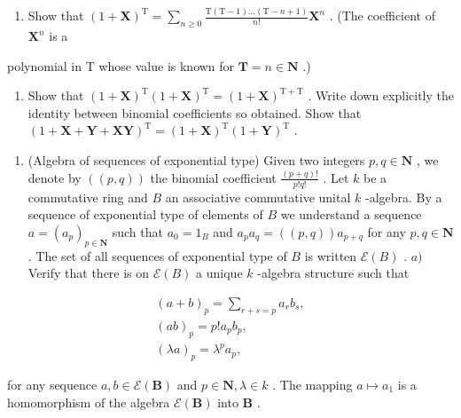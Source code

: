 \begin{enumerate}
\def\labelenumi{\alph{enumi})}
\tightlist
\item
  Show that \((1 + \mathbf{X})^{\mathrm{T}} = \sum_{n\geqslant 0}\frac{\mathrm{T}(\mathrm{T} - 1)\dots(\mathrm{T} - n + 1)}{n!}\mathbf{X}^{n}\) . (The coefficient of \(\mathbf{X}^n\) is a
\end{enumerate}

polynomial in T whose value is known for \(\mathbf{T} = n\in \mathbf{N}\) .)

\begin{enumerate}
\def\labelenumi{\alph{enumi})}
\setcounter{enumi}{1}
\tightlist
\item
  Show that \((1 + \mathbf{X})^{\mathrm{T}}(1 + \mathbf{X})^{\mathrm{T}} = (1 + \mathbf{X})^{\mathrm{T} + \mathrm{T}}\) . Write down explicitly the identity between binomial coefficients so obtained. Show that \((1 + \mathbf{X} + \mathbf{Y} + \mathbf{XY})^{\mathrm{T}} = (1 + \mathbf{X})^{\mathrm{T}}(1 + \mathbf{Y})^{\mathrm{T}}\) .
\end{enumerate}

\BourbakiExerciseGroup

\begin{enumerate}
\def\labelenumi{\arabic{enumi})}
\tightlist
\item
  (Algebra of sequences of exponential type) Given two integers \(p, q \in \mathbf{N}\) , we denote by \(((p, q))\) the binomial coefficient \(\frac{(p + q)!}{p!q!}\) . Let \(k\) be a commutative ring and \(B\) an associative commutative unital \(k\) -algebra. By a sequence of exponential type of elements of \(B\) we understand a sequence \(a = (a_p)_{p \in \mathbf{N}}\) such that \(a_0 = 1_B\) and \(a_p a_q = ((p, q)) a_{p + q}\) for any \(p, q \in \mathbf{N}\) . The set of all sequences of exponential type of \(B\) is written \(\mathcal{E}(B)\) . \(a)\) Verify that there is on \(\mathcal{E}(B)\) a unique \(k\) -algebra structure such that
\end{enumerate}

\[
\begin{array}{c} (a + b) _ {p} = \sum_ {r + s = p} a _ {r} b _ {s}, \\ (a b) _ {p} = p! a _ {p} b _ {p}, \\ (\lambda a) _ {p} = \lambda^ {p} a _ {p}, \end{array}
\]

for any sequence \(a, b \in \mathcal{E}(\mathbf{B})\) and \(p \in \mathbf{N}, \lambda \in k\) . The mapping \(a \mapsto a_1\) is a homomorphism of the algebra \(\mathcal{E}(\mathbf{B})\) into \(\mathbf{B}\) .


